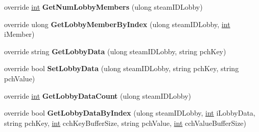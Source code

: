 \begin{DoxyCompactItemize}
\item 
\hypertarget{classValve_1_1Steamworks_1_1CSteamMatchmaking_a709e97a62a3fbbcfc9ea2f4cbdfcb95c}{}override \hyperlink{SDL__thread_8h_a6a64f9be4433e4de6e2f2f548cf3c08e}{int} {\bfseries Get\+Num\+Lobby\+Members} (ulong steam\+I\+D\+Lobby)\label{classValve_1_1Steamworks_1_1CSteamMatchmaking_a709e97a62a3fbbcfc9ea2f4cbdfcb95c}

\item 
\hypertarget{classValve_1_1Steamworks_1_1CSteamMatchmaking_a59a27dc0e062cfbdb1e6c5f82daa1f0e}{}override ulong {\bfseries Get\+Lobby\+Member\+By\+Index} (ulong steam\+I\+D\+Lobby, \hyperlink{SDL__thread_8h_a6a64f9be4433e4de6e2f2f548cf3c08e}{int} i\+Member)\label{classValve_1_1Steamworks_1_1CSteamMatchmaking_a59a27dc0e062cfbdb1e6c5f82daa1f0e}

\item 
\hypertarget{classValve_1_1Steamworks_1_1CSteamMatchmaking_a86a73b45fa20418bf1fca81e1c73cb43}{}override string {\bfseries Get\+Lobby\+Data} (ulong steam\+I\+D\+Lobby, string pch\+Key)\label{classValve_1_1Steamworks_1_1CSteamMatchmaking_a86a73b45fa20418bf1fca81e1c73cb43}

\item 
\hypertarget{classValve_1_1Steamworks_1_1CSteamMatchmaking_a5162a2768bdb0ec3f13d8cb082bb2797}{}override bool {\bfseries Set\+Lobby\+Data} (ulong steam\+I\+D\+Lobby, string pch\+Key, string pch\+Value)\label{classValve_1_1Steamworks_1_1CSteamMatchmaking_a5162a2768bdb0ec3f13d8cb082bb2797}

\item 
\hypertarget{classValve_1_1Steamworks_1_1CSteamMatchmaking_ad75f519d43c37280e5d446db196ca586}{}override \hyperlink{SDL__thread_8h_a6a64f9be4433e4de6e2f2f548cf3c08e}{int} {\bfseries Get\+Lobby\+Data\+Count} (ulong steam\+I\+D\+Lobby)\label{classValve_1_1Steamworks_1_1CSteamMatchmaking_ad75f519d43c37280e5d446db196ca586}

\item 
\hypertarget{classValve_1_1Steamworks_1_1CSteamMatchmaking_aba49c32e4332b374db1dcaa5b960b8ba}{}override bool {\bfseries Get\+Lobby\+Data\+By\+Index} (ulong steam\+I\+D\+Lobby, \hyperlink{SDL__thread_8h_a6a64f9be4433e4de6e2f2f548cf3c08e}{int} i\+Lobby\+Data, string pch\+Key, \hyperlink{SDL__thread_8h_a6a64f9be4433e4de6e2f2f548cf3c08e}{int} cch\+Key\+Buffer\+Size, string pch\+Value, \hyperlink{SDL__thread_8h_a6a64f9be4433e4de6e2f2f548cf3c08e}{int} cch\+Value\+Buffer\+Size)\label{classValve_1_1Steamworks_1_1CSteamMatchmaking_aba49c32e4332b374db1dcaa5b960b8ba}


\end{DoxyCompactItemize}
